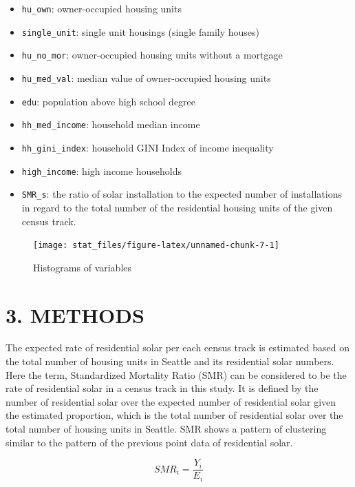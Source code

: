 \documentclass[11pt,]{article}
\providecommand{\tightlist}{%
  \setlength{\itemsep}{0pt}\setlength{\parskip}{0pt}}
\begin{document}
\begin{itemize}
\tightlist
\item
  \texttt{hu\_own}: owner-occupied housing units
\item
  \texttt{single\_unit}: single unit housings (single family houses)
\item
  \texttt{hu\_no\_mor}: owner-occupied housing units without a mortgage
\item
  \texttt{hu\_med\_val}: median value of owner-occupied housing units
\item
  \texttt{edu}: population above high school degree
\item
  \texttt{hh\_med\_income}: household median income
\item
  \texttt{hh\_gini\_index}: household GINI Index of income inequality
\item
  \texttt{high\_income}: high income households
\item
  \texttt{SMR\_s}: the ratio of solar installation to the expected
  number of installations in regard to the total number of the
  residential housing units of the given census track.
\end{itemize}

\begin{figure}

{\centering \texttt{[image: stat\_files/figure-latex/unnamed-chunk-7-1]} 

}

\caption{Histograms of variables}\label{fig:unnamed-chunk-7}
\end{figure}

\hypertarget{methods}{%
\section{3. METHODS}\label{methods}}

The expected rate of residential solar per each census track is
estimated based on the total number of housing units in Seattle and its
residential solar numbers. Here the term, Standardized Mortality Ratio
(SMR) can be considered to be the rate of residential solar in a census
track in this study. It is defined by the number of residential solar
over the expected number of residential solar given the estimated
proportion, which is the total number of residential solar over the
total number of housing units in Seattle. SMR shows a pattern of
clustering similar to the pattern of the previous point data of
residential solar.

\[ SMR_i = \frac{Y_i}{E_i} \]
\end{document}
